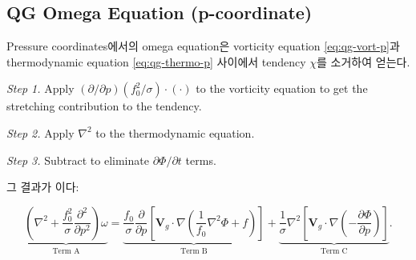 
\subsection{QG Omega Equation (p-coordinate)}\label{subsec:omega-eq-p}

Pressure coordinates에서의 omega equation은 vorticity equation \eqref{eq:qg-vort-p}과
thermodynamic equation \eqref{eq:qg-thermo-p} 사이에서 tendency $\chi$를
소거하여 얻는다.

\textit{Step 1.}  Apply $(\partial/\partial p)(f_0^2/\sigma)\cdot(\cdot)$
to the vorticity equation to get the stretching contribution to the tendency.

\textit{Step 2.}  Apply $\nabla^2$ to the thermodynamic equation.

\textit{Step 3.}  Subtract to eliminate $\partial\Phi/\partial t$ terms.

\noindent
그 결과가 이다:

\begin{equation}\label{eq:omega-p}
  \boxed{
  \underbrace{
    \left(\nabla^2 + \frac{f_0^2}{\sigma}\frac{\partial^2}{\partial p^2}\right)
    \omega
  }_{\text{Term A}}
  = \underbrace{
    \frac{f_0}{\sigma}\frac{\partial}{\partial p}
    \!\left[\mathbf{V}_g\cdot\nabla
      \!\left(\frac{1}{f_0}\nabla^2\Phi + f\right)
    \right]
  }_{\text{Term B}}
  + \underbrace{
    \frac{1}{\sigma}\nabla^2
    \!\left[\mathbf{V}_g\cdot\nabla
      \!\left(-\frac{\partial\Phi}{\partial p}\right)
    \right]
  }_{\text{Term C}}.
  }
\end{equation}

